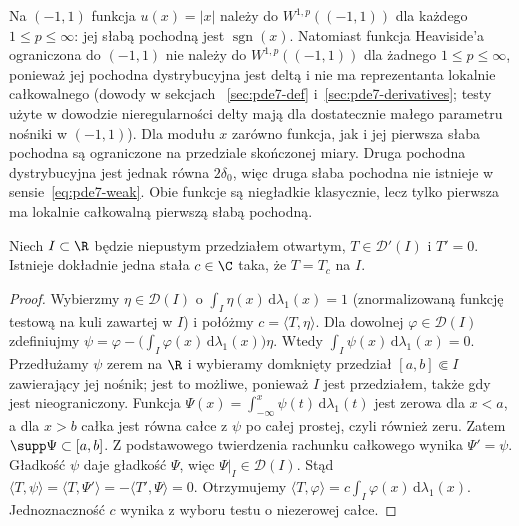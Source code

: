 \begin{przyklad}
Na $(-1,1)$ funkcja $u(x)=|x|$ należy do
$W^{1,p}((-1,1))$ dla każdego $1\le p\le\infty$:
jej słabą pochodną jest $\operatorname{sgn}(x)$.
Natomiast funkcja Heaviside'a ograniczona do $(-1,1)$
nie należy do $W^{1,p}((-1,1))$ dla żadnego
$1\le p\le\infty$, ponieważ jej pochodna
dystrybucyjna jest deltą i nie ma reprezentanta
lokalnie całkowalnego (dowody w sekcjach
~\ref{sec:pde7-def} i~\ref{sec:pde7-derivatives};
testy użyte w dowodzie nieregularności delty
mają dla dostatecznie małego parametru nośniki
w $(-1,1)$).
Dla modułu $x$ zarówno funkcja, jak i jej pierwsza
słaba pochodna są ograniczone na przedziale
skończonej miary. Druga pochodna dystrybucyjna
jest jednak równa $2\delta_0$, więc druga słaba
pochodna nie istnieje w sensie~\eqref{eq:pde7-weak}.
Obie funkcje są niegładkie klasycznie, lecz tylko
pierwsza ma lokalnie całkowalną pierwszą słabą pochodną.
\end{przyklad}

\begin{twierdzenie}
\label{thm:pde7-constant}
Niech $I\subset\R$ będzie niepustym przedziałem otwartym,
$T\in\mathcal D'(I)$ i $T'=0$. Istnieje dokładnie jedna
stała $c\in\C$ taka, że $T=T_c$ na $I$.
\end{twierdzenie}
\begin{proof}
Wybierzmy $\eta\in\mathcal D(I)$ o
$\int_I\eta(x)\,\mathrm d\lambda_1(x)=1$
(znormalizowaną funkcję testową na kuli
zawartej w $I$) i połóżmy $c=\langle T,\eta\rangle$.
Dla dowolnej $\varphi\in\mathcal D(I)$ zdefiniujmy
$\psi=\varphi-\bigl(\int_I\varphi(x)\,\mathrm d\lambda_1(x)\bigr)\eta$.
Wtedy $\int_I\psi(x)\,\mathrm d\lambda_1(x)=0$.
Przedłużamy $\psi$ zerem na $\R$ i wybieramy
domknięty przedział $[a,b]\Subset I$ zawierający
jej nośnik; jest to możliwe, ponieważ $I$ jest
przedziałem, także gdy jest nieograniczony.
Funkcja $\Psi(x)=\int_{-\infty}^x\psi(t)
\,\mathrm d\lambda_1(t)$ jest zerowa dla $x<a$,
a dla $x>b$ całka jest równa całce z $\psi$
po całej prostej, czyli również zeru.
Zatem $\supp\Psi\subset[a,b]$.
Z podstawowego twierdzenia rachunku całkowego
wynika $\Psi'=\psi$. Gładkość $\psi$ daje gładkość
$\Psi$, więc $\Psi|_I\in\mathcal D(I)$. Stąd
$\langle T,\psi\rangle=\langle T,\Psi'\rangle
=-\langle T',\Psi\rangle=0$. Otrzymujemy
$\langle T,\varphi\rangle=c\int_I\varphi(x)\,\mathrm d\lambda_1(x)$.
Jednoznaczność $c$ wynika z wyboru testu o niezerowej całce.
\end{proof}

